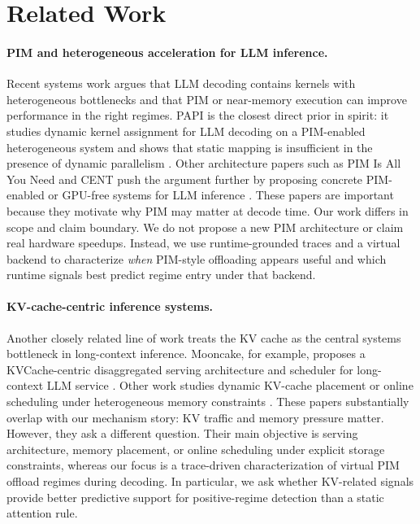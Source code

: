 \section{Related Work}
\label{sec:related}

\paragraph{PIM and heterogeneous acceleration for LLM inference.}
Recent systems work argues that LLM decoding contains kernels with heterogeneous bottlenecks and that PIM or near-memory execution can improve performance in the right regimes. PAPI is the closest direct prior in spirit: it studies dynamic kernel assignment for LLM decoding on a PIM-enabled heterogeneous system and shows that static mapping is insufficient in the presence of dynamic parallelism \citep{he2025papi}. Other architecture papers such as PIM Is All You Need and CENT push the argument further by proposing concrete PIM-enabled or GPU-free systems for LLM inference \citep{gu2025pim,wang2025cent}. These papers are important because they motivate why PIM may matter at decode time. Our work differs in scope and claim boundary. We do not propose a new PIM architecture or claim real hardware speedups. Instead, we use runtime-grounded traces and a virtual backend to characterize \emph{when} PIM-style offloading appears useful and which runtime signals best predict regime entry under that backend.

\paragraph{KV-cache-centric inference systems.}
Another closely related line of work treats the KV cache as the central systems bottleneck in long-context inference. Mooncake, for example, proposes a KVCache-centric disaggregated serving architecture and scheduler for long-context LLM service \citep{qin2025mooncake}. Other work studies dynamic KV-cache placement or online scheduling under heterogeneous memory constraints \citep{akhauri2025kvplacement,microsoft2025kvscheduling}. These papers substantially overlap with our mechanism story: KV traffic and memory pressure matter. However, they ask a different question. Their main objective is serving architecture, memory placement, or online scheduling under explicit storage constraints, whereas our focus is a trace-driven characterization of virtual PIM offload regimes during decoding. In particular, we ask whether KV-related signals provide better predictive support for positive-regime detection than a static attention rule.

